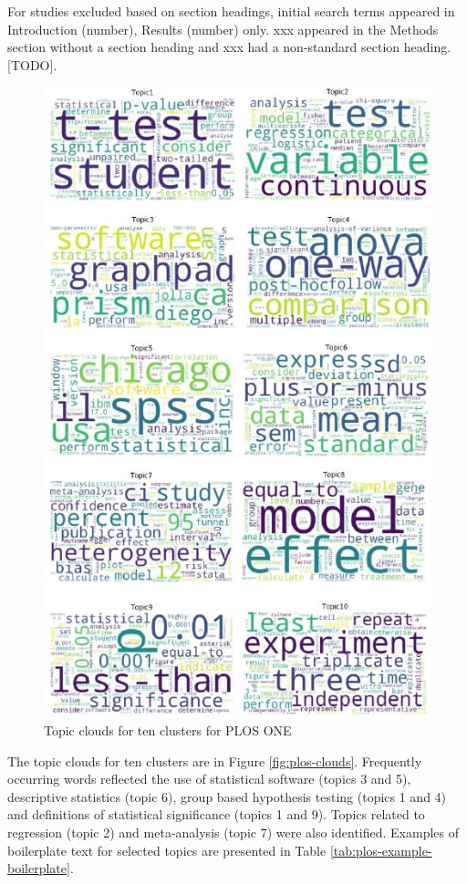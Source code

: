 \documentclass[12pt]{article}
\begin{document}
For studies excluded based on section headings, initial search terms
appeared in Introduction (number), Results (number) only. xxx appeared
in the Methods section without a section heading and xxx had a
non-standard section heading. {[}TODO{]}.

\begin{figure}

{\centering \includegraphics[width=0.8\linewidth]{figures/ploswordclouds} 

}

\caption{\label{fig:plos-clouds}Topic clouds for ten clusters for PLOS ONE}\label{fig:unnamed-chunk-6}
\end{figure}

The topic clouds for ten clusters are in Figure \ref{fig:plos-clouds}.
Frequently occurring words reflected the use of statistical software
(topics 3 and 5), descriptive statistics (topic 6), group based
hypothesis testing (topics 1 and 4) and definitions of statistical
significance (topics 1 and 9). Topics related to
regression (topic 2) and meta-analysis (topic 7) were also identified.
Examples of boilerplate text for selected topics are presented in Table
\ref{tab:plos-example-boilerplate}.
\end{document}

